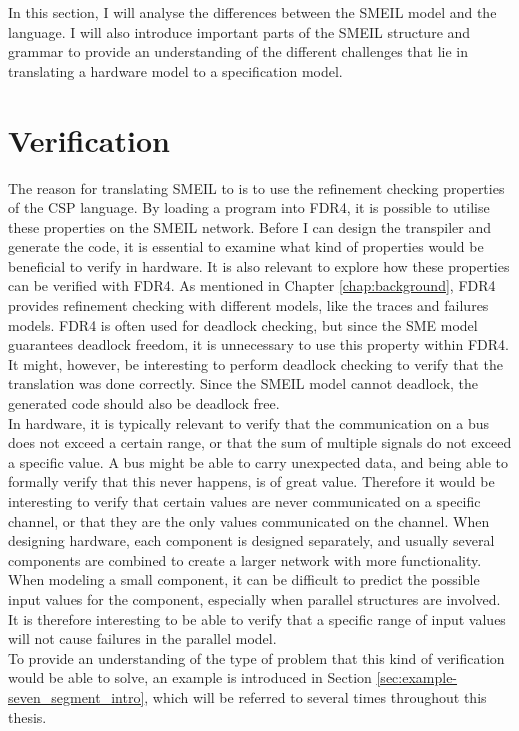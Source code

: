 In this section, I will analyse the differences between the SMEIL model and the \cspm{} language. I will also introduce important parts of the SMEIL structure and grammar to provide an understanding of the different challenges that lie in translating a hardware model to a specification model.
\section{Verification}
\label{sec:analysis_verification}
The reason for translating SMEIL to \cspm{} is to use the refinement checking properties of the CSP language. By loading a \cspm{} program into FDR4, it is possible to utilise these properties on the SMEIL network. Before I can design the transpiler and generate the \cspm{} code, it is essential to examine what kind of properties would be beneficial to verify in hardware. It is also relevant to explore how these properties can be verified with FDR4. As mentioned in Chapter \ref{chap:background}, FDR4 provides refinement checking with different models, like the traces and failures models. FDR4 is often used for deadlock checking, but since the SME model guarantees deadlock freedom, it is unnecessary to use this property within FDR4. It might, however, be interesting to perform deadlock checking to verify that the translation was done correctly. Since the SMEIL model cannot deadlock, the generated \cspm{} code should also be deadlock free.\\

In hardware, it is typically relevant to verify that the communication on a bus does not exceed a certain range, or that the sum of multiple signals do not exceed a specific value. A bus might be able to carry unexpected data, and being able to formally verify that this never happens, is of great value. Therefore it would be interesting to verify that certain values are never communicated on a specific channel, or that they are the only values communicated on the channel. When designing hardware, each component is designed separately, and usually several components are combined to create a larger network with more functionality. When modeling a small component, it can be difficult to predict the possible input values for the component, especially when parallel structures are involved. It is therefore interesting to be able to verify that a specific range of input values will not cause failures in the parallel model.\\

To provide an understanding of the type of problem that this kind of verification would be able to solve, an example is introduced in Section \ref{sec:example-seven_segment_intro}, which will be referred to several times throughout this thesis.
